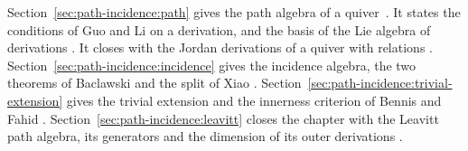 
Section~\ref{sec:path-incidence:path} gives the path algebra of a quiver~\cite[Corollary~3.8, p.~79]{Lopatkin2019}. It
states the conditions of Guo and Li on a derivation, and the basis of the Lie
algebra of derivations \cite[Theorem~3.4, p.~555]{GuoLi2014}. It closes with
the Jordan derivations of a quiver with relations \cite[Theorem~3.4,
p.~129]{LiWei2018}. Section~\ref{sec:path-incidence:incidence} gives the
incidence algebra, the two theorems of Baclawski \cite[pp.~352,
354]{Baclawski1972} and the split of Xiao \cite[Proposition~2.5,
p.~1362]{Xiao2015}. Section~\ref{sec:path-incidence:trivial-extension} gives
the trivial extension and the innerness criterion of Bennis and Fahid
\cite[Theorem~3.12, p.~14]{BennisFahid2017}.
Section~\ref{sec:path-incidence:leavitt} closes the chapter with the Leavitt
path algebra, its generators and the dimension of its outer derivations
\cite[Corollary~3.8, p.~79]{Lopatkin2019}.
